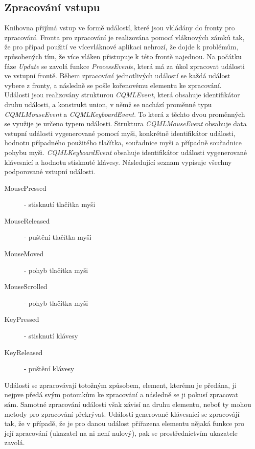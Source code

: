 \documentclass[11pt,twoside,a4paper]{book}
\begin{document}
{{\begin{ttemize}
{{\begin{lastlisting}[frame=single,caption=Řešení v pseudokódu problematického použití operátoru "." v přiřazovacím výroku,label=lst:var0N]
\subsection{Zpracování vstupu}
Knihovna přijímá vstup ve formě událostí, které jsou vkládány do fronty pro zpracování. Fronta pro zpracování je realizována pomocí vláknových zámků tak, že pro případ použití ve vícevláknové aplikaci nehrozí, že dojde k problémům, způsobených tím, že více vláken přistupuje k této frontě najednou.
Na počátku fáze \textit{Update} se zavolá funkce \textit{ProcessEvent}s, která má za úkol zpracovat události ve vstupní frontě. Během zpracování jednotlivých událostí se každá událost vybere z fronty, a následně se pošle kořenovému elementu ke zpracování. \\
Události jsou realizovány strukturou \textit{CQMLEvent}, která obsahuje identifikátor druhu události, a konstrukt union, v němž se nachází proměnné typu \textit{CQMLMouseEvent} a \textit{CQMLKeyboardEvent}. To která z těchto dvou proměnných se využije je určeno typem události. Struktura \textit{CQMLMouseEvent} obsahuje data vstupní události vygenerované pomocí myši, konkrétně identifikátor události, hodnotu případného použitého tlačítka, souřadnice myši a případně souřadnice pohybu myši. \textit{CQMLKeyboardEvent} obsahuje identifikátor události vygenerované klávesnicí a hodnotu stisknuté klávesy. Následující seznam vypisuje všechny podporované vstupní události.
\begin{description}
\item[MousePressed] - stisknutí tlačítka myši
\item[MouseReleased] - puštění tlačítka myši
\item[MouseMoved] - pohyb tlačítka myši
\item[MouseScrolled] - pohyb tlačítka myši
\item[KeyPressed] - stisknutí klávesy
\item[KeyReleased] - puštění klávesy
\end{description}
Události se zpracovávají totožným způsobem, element, kterému je předána, ji nejpve předá svým potomkům ke zpracování a následně se ji pokusí zpracovat sám. Samotné zpracování události však závisí na druhu elementu, neboť ty mohou metody pro zpracování překrývat.
Události generované klávesnicí se zpracovájí tak, že v případě, že je pro danou událost přiřazena elementu nějaká funkce pro její zpracování (ukazatel na ni není nulový), pak se prostřednictvím ukazatele zavolá.

\end{lastlisting}}}
\end{ttemize}}}
\end{document}
